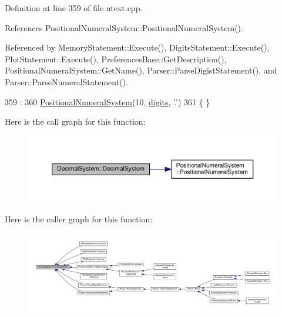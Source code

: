 Definition at line 359 of file ntext.\+cpp.



References Positional\+Numeral\+System\+::\+Positional\+Numeral\+System().



Referenced by Memory\+Statement\+::\+Execute(), Digits\+Statement\+::\+Execute(), Plot\+Statement\+::\+Execute(), Preferences\+Base\+::\+Get\+Description(), Positional\+Numeral\+System\+::\+Get\+Name(), Parser\+::\+Parse\+Digist\+Statement(), and Parser\+::\+Parse\+Numeral\+Statement().


\begin{DoxyCode}
359                                                 :
360     \hyperlink{classPositionalNumeralSystem_a923f36569ecc830f17bcf56dd2811754}{PositionalNumeralSystem}(10, \hyperlink{classPositionalNumeralSystem_a0a9e8e3f5d46e3c12dd3fc994ed2c1e6}{digits}, \textcolor{charliteral}{'.'})
361 \{ \}
\end{DoxyCode}


Here is the call graph for this function\+:
\nopagebreak
\begin{figure}[H]
\begin{center}
\leavevmode
\includegraphics[width=350pt]{df/d40/classDecimalSystem_a726d1a38079ae571c54adfbd0724a0a3_cgraph}
\end{center}
\end{figure}




Here is the caller graph for this function\+:
\nopagebreak
\begin{figure}[H]
\begin{center}
\leavevmode
\includegraphics[width=350pt]{df/d40/classDecimalSystem_a726d1a38079ae571c54adfbd0724a0a3_icgraph}
\end{center}
\end{figure}


